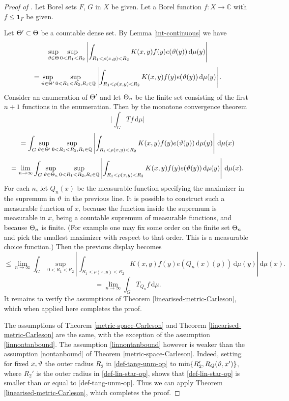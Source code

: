 \begin{proof}[Proof of ]
    \leanok
    Let Borel sets $F$, $G$ in $X$ be given. Let a Borel function $f: X \to \mathbb{C}$ with $f \le \mathbf{1}_F$ be given.

    Let ${\Theta}' \subset {\Theta}$ be a countable dense set. By Lemma \ref{int-continuous} we have
    \[
        \sup_{{\vartheta}\in{\Theta}} \sup_{0 < R_1 < R_2}\left| \int_{R_1 < \rho(x,y) < R_2} K(x,y) f(y) e({\vartheta}(y)) \, \mathrm{d}\mu(y) \right|
    \]
    \[
        = \sup_{{\vartheta}\in{\Theta}'} \sup_{0 < R_1 < R_2, R_i \in \mathbb{Q}}\left| \int_{R_1 < \rho(x,y) < R_2} K(x,y) f(y) e({\vartheta}(y)) \, \mathrm{d}\mu(y) \right|.
    \]
    Consider an enumeration of ${\Theta}'$ and let ${\Theta}_n$ be the finite set consisting of the first $n+1$ functions in the enumeration. Then by the monotone convergence theorem
    \[
        \Big| \int_G Tf \, \mathrm{d}\mu\Big|
    \]
    \[
        = \int_G \sup_{{\vartheta}\in{\Theta}'} \sup_{0 < R_1 < R_2, R_i \in \mathbb{Q}}\left| \int_{R_1 < \rho(x,y) < R_2} K(x,y) f(y) e({\vartheta}(y)) \, \mathrm{d}\mu(y) \right| \, \mathrm{d}\mu(x)
    \]
    \[
        = \lim_{n \to \infty} \int_G \sup_{{\vartheta}\in{\Theta}_n} \sup_{0 < R_1 < R_2, R_i \in \mathbb{Q}}\left| \int_{R_1 < \rho(x,y) < R_2} K(x,y) f(y) e({\vartheta}(y)) \, \mathrm{d}\mu(y) \right| \, \mathrm{d}\mu(x).
    \]
    For each $n$, let $Q_n(x)$ be the measurable function specifying the maximizer in the supremum in ${\vartheta}$ in the previous line. It is possible to construct such a measurable function of $x$, because the function inside the supremum is measurable in $x$, being a countable supremum of measurable functions, and because ${\Theta}_n$ is finite. (For example one may fix some order on the finite set ${\Theta}_n$ and pick the smallest maximizer with respect to that order. This is a measurable choice function.) Then the previous display becomes
    \[
        \le \lim_{n \to \infty} \int_G \sup_{0 < R_1 < R_2} \left| \int_{R_1 < \rho(x,y) < R_2} K(x,y) f(y) e(Q_n(x)(y)) \, \mathrm{d}\mu(y) \right| \, \mathrm{d}\mu(x).
    \]
    \[
        = \lim_{n \to \infty} \int_G T_{Q_n} f \, \mathrm{d}\mu.
    \]
    It remains to verify the assumptions of Theorem \ref{linearised-metric-Carleson}, which when applied here completes the proof.

    The assumptions of Theorem \ref{metric-space-Carleson} and Theorem \ref{linearised-metric-Carleson} are the same,
    with the exception of the assumption \eqref{linnontanbound}.
    The assumption \eqref{linnontanbound} however is weaker than the assumption \eqref{nontanbound}
    of Theorem \ref{metric-space-Carleson}.
    Indeed, setting for fixed $x, {\vartheta}$ the outer radius $R_2$ in \eqref{def-tang-unm-op} to
    $\min\{R_2', R_Q({\vartheta}, x')\}$, where $R_2'$ is the outer radius in \eqref{def-lin-star-op},
    shows that \eqref{def-lin-star-op} is smaller than or equal to \eqref{def-tang-unm-op}.
    Thus we can apply Theorem \ref{linearised-metric-Carleson}, which completes the proof.
\end{proof}

